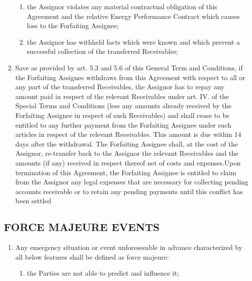 \documentclass[a4paper]{article}
\begin{document}
\begin{multicols}{2}
\begin{enumerate}
\begin{enumerate}
    \item{the Assignor violates any material contractual obligation of
        this Agreement and the relative Energy Performance Contract
        which causes loss to the Forfaiting Assignee;}

    \item{the Assignor has withheld facts which were known and which
        prevent a successful collection of the transferred
        Receivables;}
    \end{enumerate}

  \item{Save as provided by art. 5.3 and 5.6 of this General Term and
      Conditions, if the Forfaiting Assignee withdraws from this
      Agreement with respect to all or any part of the transferred
      Receivables, the Assignor has to repay any amount paid in
      respect of the relevant Receivables under art. IV. of the
      Special Terms and Conditions (less any amounts already received
      by the Forfaiting Assignee in respect of such Receivables) and
      shall cease to be entitled to any further payment from the
      Forfaiting Assignee under such articles in respect of the
      relevant Receivables. This amount is due within 14 days after
      the withdrawal. The Forfaiting Assignee shall, at the cost of
      the Assignor, re{-}transfer back to the Assignor the relevant
      Receivables and the amounts (if any) received in respect thereof
      net of costs and expenses.Upon termination of this Agreement,
      the Forfaiting Assignee is entitled to claim from the Assignor
      any legal expenses that are necessary for collecting pending
      accounts receivable or to retain any pending payments until this
      conflict has been settled }
  \end{enumerate}

  \subsection{FORCE MAJEURE EVENTS}

  \begin{enumerate}
  \item{Any emergency situation or event unforeseeable in advance
      characterized by all below features shall be defined as force
      majeure:}

    \begin{enumerate}
    \item{the Parties are not able to predict and influence it;}


\end{enumerate}
\end{enumerate}
\end{multicols}
\end{document}
